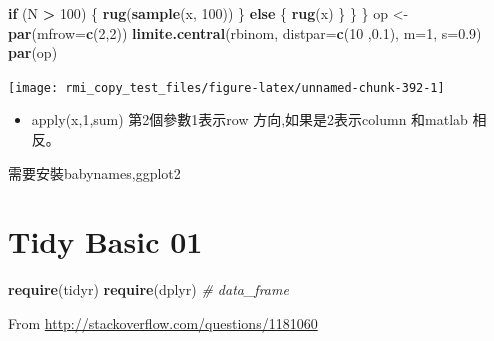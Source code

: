 \documentclass[]{book}
\newenvironment{Shaded}{\begin{snugshade}}{\end{snugshade}}
\newcommand{\KeywordTok}[1]{\textcolor[rgb]{0.13,0.29,0.53}{\textbf{#1}}}
\newcommand{\DataTypeTok}[1]{\textcolor[rgb]{0.13,0.29,0.53}{#1}}
\newcommand{\DecValTok}[1]{\textcolor[rgb]{0.00,0.00,0.81}{#1}}
\newcommand{\FloatTok}[1]{\textcolor[rgb]{0.00,0.00,0.81}{#1}}
\newcommand{\StringTok}[1]{\textcolor[rgb]{0.31,0.60,0.02}{#1}}
\newcommand{\CommentTok}[1]{\textcolor[rgb]{0.56,0.35,0.01}{\textit{#1}}}
\newcommand{\ControlFlowTok}[1]{\textcolor[rgb]{0.13,0.29,0.53}{\textbf{#1}}}
\newcommand{\OperatorTok}[1]{\textcolor[rgb]{0.81,0.36,0.00}{\textbf{#1}}}
\newcommand{\NormalTok}[1]{#1}
\providecommand{\tightlist}{%
  \setlength{\itemsep}{0pt}\setlength{\parskip}{0pt}}
\theoremstyle{definition}
\theoremstyle{definition}
\theoremstyle{definition}
\theoremstyle{remark}
\begin{document}
\begin{Shaded}
\begin{Highlighting}[]
      \ControlFlowTok{if}\NormalTok{ (N }\OperatorTok{>}\StringTok{ }\DecValTok{100}\NormalTok{) \{}
        \KeywordTok{rug}\NormalTok{(}\KeywordTok{sample}\NormalTok{(x, }\DecValTok{100}\NormalTok{))}
\NormalTok{      \} }\ControlFlowTok{else}\NormalTok{ \{}
        \KeywordTok{rug}\NormalTok{(x)}
\NormalTok{      \}}
\NormalTok{    \}}
\NormalTok{  \}}
\NormalTok{op <-}\StringTok{ }\KeywordTok{par}\NormalTok{(}\DataTypeTok{mfrow=}\KeywordTok{c}\NormalTok{(}\DecValTok{2}\NormalTok{,}\DecValTok{2}\NormalTok{))}
\KeywordTok{limite.central}\NormalTok{(rbinom, }\DataTypeTok{distpar=}\KeywordTok{c}\NormalTok{(}\DecValTok{10}\NormalTok{ ,}\FloatTok{0.1}\NormalTok{), }\DataTypeTok{m=}\DecValTok{1}\NormalTok{, }\DataTypeTok{s=}\FloatTok{0.9}\NormalTok{)}
\KeywordTok{par}\NormalTok{(op)}
\end{Highlighting}
\end{Shaded}

\begin{center}\texttt{[image: rmi\_copy\_test\_files/figure-latex/unnamed-chunk-392-1]} \end{center}

\begin{itemize}
\tightlist
\item
  apply(x,1,sum) 第2個參數1表示row 方向,如果是2表示column 和matlab
  相反。
\end{itemize}

\begin{Shaded}
\begin{Highlighting}[]
\NormalTok{需要安裝babynames,ggplot2}
\end{Highlighting}
\end{Shaded}

\chapter{Tidy Basic 01}\label{tidy-basic-01}

\begin{Shaded}
\begin{Highlighting}[]
\KeywordTok{require}\NormalTok{(tidyr)}
\KeywordTok{require}\NormalTok{(dplyr) }\CommentTok{# data_frame}
\end{Highlighting}
\end{Shaded}

From \url{http://stackoverflow.com/questions/1181060}
\end{document}
